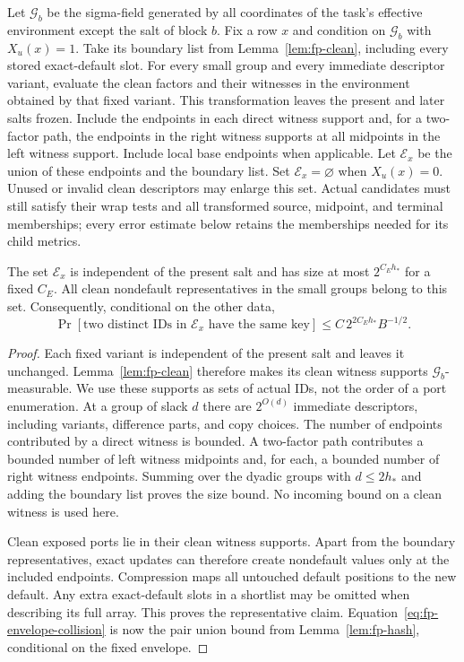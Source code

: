 Let $\mathcal G_b$ be the sigma-field generated by all coordinates of the
task's effective environment except the salt of block $b$.  Fix a row
$x$ and condition on $\mathcal G_b$ with $X_u(x)=1$.  Take its boundary list from
Lemma~\ref{lem:fp-clean}, including every stored exact-default slot.
For every small group and every immediate
descriptor variant, evaluate the clean factors and their witnesses in
the environment obtained by that fixed variant.  This transformation
leaves the present and later salts frozen.  Include the endpoints in
each direct witness support and, for a two-factor path, the endpoints
in the right witness supports at all midpoints in the left witness
support.  Include local base endpoints when applicable.  Let
$\mathcal E_x$ be the union of these endpoints and the boundary list.
Set $\mathcal E_x=\varnothing$ when $X_u(x)=0$.
Unused or invalid clean descriptors may enlarge this set.  Actual
candidates must still satisfy their wrap tests and all transformed
source, midpoint, and terminal memberships; every error estimate below
retains the memberships needed for its child metrics.

\begin{lemma}
\label{lem:fp-envelope}
The set $\mathcal E_x$ is independent of the present salt and has size at
most $2^{C_Eh_*}$ for a fixed $C_E$.  All clean nondefault representatives
in the small groups belong to this set.  Consequently, conditional on
the other data,
\begin{equation}
 \Pr[\text{two distinct IDs in $\mathcal E_x$ have the same key}]
 \le C\,2^{2C_Eh_*}B^{-1/2}.
 \label{eq:fp-envelope-collision}
\end{equation}
\end{lemma}

\begin{proof}
Each fixed variant is independent of the present salt and leaves it
unchanged.  Lemma~\ref{lem:fp-clean} therefore makes its clean witness
supports $\mathcal G_b$-measurable.  We use these supports as sets of
actual IDs, not the order of a port enumeration.  At a group of slack
$d$ there are $2^{O(d)}$ immediate descriptors, including variants,
difference parts, and copy choices.  The number of endpoints contributed by a direct
witness is bounded.  A two-factor path contributes a bounded number of
left witness midpoints and, for each, a bounded number of right witness
endpoints.  Summing over the dyadic groups with $d\le2h_*$ and adding the
boundary list proves the size bound.  No incoming bound on a clean
witness is used here.

Clean exposed ports lie in their clean witness supports.  Apart from the
boundary representatives, exact updates can therefore create nondefault
values only at the included endpoints.  Compression maps all untouched
default positions to the new default.  Any extra exact-default slots in
a shortlist may be omitted when describing its full array.  This proves
the representative claim.  Equation~\eqref{eq:fp-envelope-collision}
is now the pair union bound from Lemma~\ref{lem:fp-hash}, conditional on
the fixed envelope.
\end{proof}

